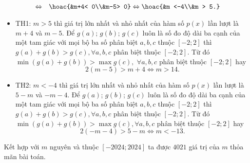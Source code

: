 \begin{ex}
{\begin{eqnarray*}
			&\Leftrightarrow& \hoac{&m+4< 0\\&m-5> 0} \Leftrightarrow \hoac{&m <-4\\&m > 5.}			
		\end{eqnarray*}		
		\begin{itemize}
			\item TH1: $m>5$ thì giá trị lớn nhất và nhỏ nhất của hàm số $p(x)$ lần lượt là $m+4$ và $m-5$.	Để $g(a);\,g(b);\,g(c)$ luôn là số đo độ dài ba cạnh của một tam giác với mọi bộ ba số phân biệt $a,b,c$ thuộc $[-2;2]$ thì $g(a)+g(b) > g(c),\forall a,b,c$ phân biệt thuộc $[-2;2]$. Từ đó $\min \left(g(a)+g(b)\right) > \max g(c),\,\,\forall a,b,c$ phân biệt thuộc $[-2;2]$ 
			hay \[2\left(m-5\right) > m+4\Leftrightarrow m > 14.\]
			\item TH2:  $m<-4$ thì giá trị lớn nhất và nhỏ nhất của hàm số $p(x)$ lần lượt là $5-m$ và $-m-4$.	Để $g(a)$; $g(b)$; $g(c)$ luôn là số đo độ dài ba cạnh của một tam giác với mọi bộ ba số phân biệt $a,b,c$ thuộc $[-2;2]$ thì $g(a)+g(b) > g(c),\forall a,b,c$ phân biệt thuộc $[-2;2]$. Từ đó $\min \left(g(a)+g(b)\right) > \max g(c),\forall a,b,c$ phân biệt thuộc $[-2;2]$
			hay \[2\left(-m-4\right) > 5-m\Leftrightarrow m <-13.\]
		\end{itemize}		
		Kết hợp với $m$ nguyên và thuộc $[-2024;2024]$ ta được $4021$ giá trị của $m$ thỏa mãn bài toán.
	}
\end{ex}



%
